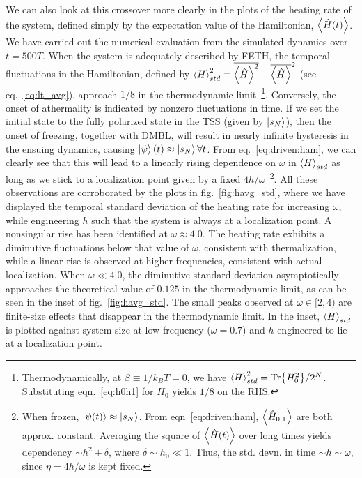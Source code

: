 \documentclass[%
reprint,
superscriptaddress,
amsmath,amssymb,
aps,
prb,
showkeys,
]{revtex4-2}
\begin{document}
We can also look at this crossover more clearly in the plots of the heating rate of the system, defined simply by the expectation value of the Hamiltonian, $\expval{\hat{H}(t)}$. We have carried out the numerical evaluation from the simulated dynamics over $t=500 T$. When the system is adequately described by FETH, the temporal fluctuations in the {Hamiltonian}, defined by $\expval{H}^2_{std}\equiv \overline{\expval{\hat{H}}^2}-\overline{\expval{\hat{H}}}^2$ (see eq.~\ref{eq:lt_avg}), approach $1/8$ in the thermodynamic limit~\footnote{Thermodynamically, at $\beta\equiv 1/k_BT=0$, we have $\expval{H}^2_{std}=\Tr{H^2_0}/2^N$. Substituting eqn.~\ref{eq:h0h1} for $H_0$ yields $1/8$ on the RHS.}. Conversely, the onset of athermality is indicated by nonzero fluctuations in time. If we set the initial state to the fully polarized state in the TSS (given by $\ket{s_N}$), then the 
onset of freezing, together with DMBL, will result in nearly infinite hysteresis in the ensuing dynamics, causing $\ket{\psi}(t)\approx \ket{s_N} \forall t$. From eq.~\ref{eq:driven:ham}, we can clearly see that this will lead to a linearly rising dependence on $\omega$ in $\expval{H}_{std}$ as long as we stick to a localization point given by a fixed $4h/\omega$~\footnote{When frozen, $\ket{\psi(t)}\approx \ket{s_N}$. From eqn~\ref{eq:driven:ham}, $\expval{\hat{H}_{0,1}}$ are both approx. constant. Averaging the square of $\expval{\hat{H}(t)}$ over long times yields dependency  $\sim h^2 + \delta$, where $\delta\sim h_0\ll 1$. Thus, the std. devn. in time $\sim h\sim \omega$, since $\eta=4h/\omega$ is kept fixed.}. All these observations are corroborated by the plots in fig.~\ref{fig:havg_std}, where we have displayed the temporal standard deviation of the heating rate for increasing $\omega$, while engineering $h$ such that the system is always at a localization point. A nonsingular rise has been identified at $\omega \approx 4.0$. The heating rate exhibits a diminutive fluctuations below that value of $\omega$, consistent with thermalization, while a linear rise is observed at higher frequencies, consistent with actual localization. When $\omega \ll 4.0$, the diminutive standard deviation asymptotically approaches the theoretical value of $0.125$ in the thermodynamic limit, as can be seen in the inset of fig.~\ref{fig:havg_std}. The small peaks observed at $\omega\in [2, 4)$ are finite-size effects that disappear in the thermodynamic limit. In the inset, $\expval{H}_{std}$ is plotted against system size at low-frequency ($\omega=0.7$) and $h$ engineered to lie at a localization point.
\end{document}
